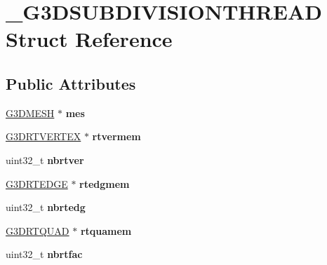\hypertarget{struct__G3DSUBDIVISIONTHREAD}{}\section{\+\_\+\+G3\+D\+S\+U\+B\+D\+I\+V\+I\+S\+I\+O\+N\+T\+H\+R\+E\+AD Struct Reference}
\label{struct__G3DSUBDIVISIONTHREAD}
\subsection*{Public Attributes}
\begin{DoxyCompactItemize}
\item 
\mbox{\label{struct__G3DSUBDIVISIONTHREAD_a3bebba6867db7d93d001ada5d6024c86}} 
\hyperlink{struct__G3DMESH}{G3\+D\+M\+E\+SH} $\ast$ {\bfseries mes}
\item 
\mbox{\label{struct__G3DSUBDIVISIONTHREAD_a5cc63415ba21f0a4e49817be25dbc734}} 
\hyperlink{struct__G3DRTVERTEX}{G3\+D\+R\+T\+V\+E\+R\+T\+EX} $\ast$ {\bfseries rtvermem}
\item 
\mbox{\label{struct__G3DSUBDIVISIONTHREAD_ac5ffdacaec06e802bf3d054556f88197}} 
uint32\+\_\+t {\bfseries nbrtver}
\item 
\mbox{\label{struct__G3DSUBDIVISIONTHREAD_ab80106e408a9d50c1532d42b0f157679}} 
\hyperlink{struct__G3DRTEDGE}{G3\+D\+R\+T\+E\+D\+GE} $\ast$ {\bfseries rtedgmem}
\item 
\mbox{\label{struct__G3DSUBDIVISIONTHREAD_a7927930d1d9c1676183246b9de58f0bc}} 
uint32\+\_\+t {\bfseries nbrtedg}
\item 
\mbox{\label{struct__G3DSUBDIVISIONTHREAD_a984cfdcc68e85c455bc35b19e09f0da6}} 
\hyperlink{struct__G3DRTQUAD}{G3\+D\+R\+T\+Q\+U\+AD} $\ast$ {\bfseries rtquamem}
\item 
\mbox{\label{struct__G3DSUBDIVISIONTHREAD_ac6304dcc4123b9a27d78c4bdd7f5828e}} 
uint32\+\_\+t {\bfseries nbrtfac}
\item 

\end{DoxyCompactItemize}
